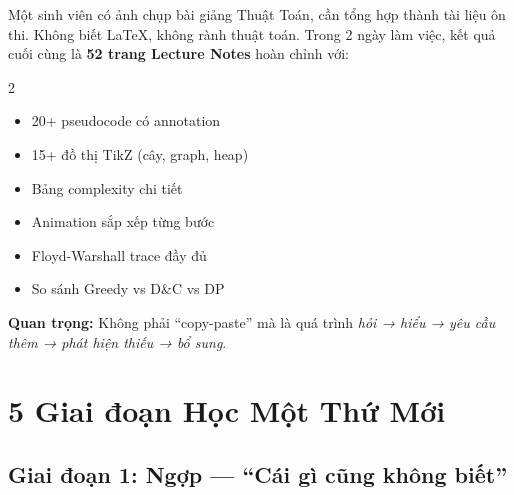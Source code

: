 \documentclass[11pt]{article}
\begin{document}
\begin{storybox}
Một sinh viên có ảnh chụp bài giảng Thuật Toán, cần tổng hợp thành tài liệu ôn thi. Không biết \LaTeX{}, không rành thuật toán. Trong 2 ngày làm việc, kết quả cuối cùng là \textbf{52 trang Lecture Notes} hoàn chỉnh với:

\begin{multicols}{2}
\begin{itemize}[leftmargin=1.2em, itemsep=2pt]
  \item 20+ pseudocode có annotation
  \item 15+ đồ thị TikZ (cây, graph, heap)
  \item Bảng complexity chi tiết
  \item Animation sắp xếp từng bước
  \item Floyd-Warshall trace đầy đủ
  \item So sánh Greedy vs D\&C vs DP
\end{itemize}
\end{multicols}

\textbf{Quan trọng:} Không phải ``copy-paste'' mà là quá trình \textit{hỏi → hiểu → yêu cầu thêm → phát hiện thiếu → bổ sung}.
\end{storybox}

\section{5 Giai đoạn Học Một Thứ Mới}

\subsection{Giai đoạn 1: Ngợp — ``Cái gì cũng không biết''}

\begin{center}
\end{center}
\end{document}
